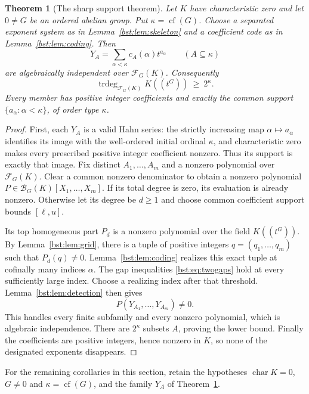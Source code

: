 \documentclass[11pt,letterpaper]{article}
\newtheorem{theorem}{Theorem}[section]
\theoremstyle{definition}
\theoremstyle{remark}
\newcommand{\trdeg}{\operatorname{trdeg}}
\newcommand{\cof}{\operatorname{cf}}
\newcommand{\HH}[2]{#1((t^{#2}))}
\newcommand{\BB}[2]{\mathcal B_{#2}(#1)}
\newcommand{\FF}[2]{\mathcal F_{#2}(#1)}
\begin{document}
\begin{theorem}[The sharp support theorem]\label{bst:thm:independent}
Let $K$ have characteristic zero and let $0\ne G$ be an ordered abelian
group. Put $\kappa=\cof(G)$. Choose a separated exponent system as in
Lemma~\ref{bst:lem:skeleton} and a coefficient code as in Lemma~\ref{bst:lem:coding}.
Then
\begin{equation}\label{bst:eq:mainfamily}
 Y_A=\sum_{\alpha<\kappa}c_A(\alpha)t^{a_\alpha}
 \qquad(A\subseteq\kappa)
\end{equation}
are algebraically independent over $\FF KG$. Consequently
\begin{equation}\label{bst:eq:lowertrdeg}
 \trdeg_{\FF KG}\HH KG\ \ge\ 2^\kappa.
\end{equation}
Every member has positive integer coefficients and exactly the common
support $\{a_\alpha:\alpha<\kappa\}$, of order type $\kappa$.
\end{theorem}
\begin{proof}
First, each $Y_A$ is a valid Hahn series: the strictly increasing map
$\alpha\mapsto a_\alpha$ identifies its image with the well-ordered
initial ordinal $\kappa$, and characteristic zero makes every prescribed
positive integer coefficient nonzero. Thus its support is exactly that image.
Fix distinct $A_1,\ldots,A_m$ and a nonzero polynomial over $\FF KG$.
Clear a common nonzero denominator to obtain a nonzero polynomial
$P\in\BB KG[X_1,\ldots,X_m]$. If its total degree is zero, its evaluation
is already nonzero. Otherwise let its degree be $d\ge1$ and choose common
coefficient support bounds $[\ell,u]$.

Its top homogeneous part $P_d$ is a nonzero polynomial over the field
$\HH KG$. By Lemma~\ref{bst:lem:grid}, there is a tuple of positive integers
$q=(q_1,\ldots,q_m)$ such that $P_d(q)\ne0$. Lemma~\ref{bst:lem:coding}
realizes this exact tuple at cofinally many indices $\alpha$. The gap
inequalities \eqref{bst:eq:twogaps} hold at every sufficiently large index.
Choose a realizing index after that threshold. Lemma~\ref{bst:lem:detection}
then gives
\[
 P(Y_{A_1},\ldots,Y_{A_m})\ne0.
\]
This handles every finite subfamily and every nonzero polynomial, which is
algebraic independence. There are $2^\kappa$ subsets $A$, proving the lower
bound. Finally the coefficients are positive integers, hence nonzero in
$K$, so none of the designated exponents disappears.
\end{proof}

For the remaining corollaries in this section, retain the hypotheses
$\operatorname{char}K=0$, $G\ne0$ and $\kappa=\cof(G)$, and the family
$Y_A$ of Theorem~\ref{bst:thm:independent}.
\end{document}
